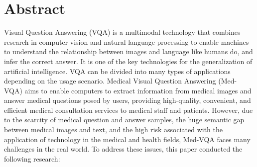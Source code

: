	

\chapter{Abstract}
Visual Question Answering (VQA) is a multimodal technology that combines research in computer vision and natural language processing to enable machines to understand the relationship between images and language like humans do, and infer the correct answer. 
It is one of the key technologies for the generalization of artificial intelligence. VQA can be divided into many types of applications depending on the usage scenario. 
Medical Visual Question Answering (Med-VQA) aims to enable computers to extract information from medical images and answer medical questions posed by users, providing high-quality, convenient, and efficient medical consultation services to medical staff and patients. 
However, due to the scarcity of medical question and answer samples, the huge semantic gap between medical images and text, and the high risk associated with the application of technology in the medical and health fields, Med-VQA faces many challenges in the real world.
To address these issues, this paper conducted the following research:
